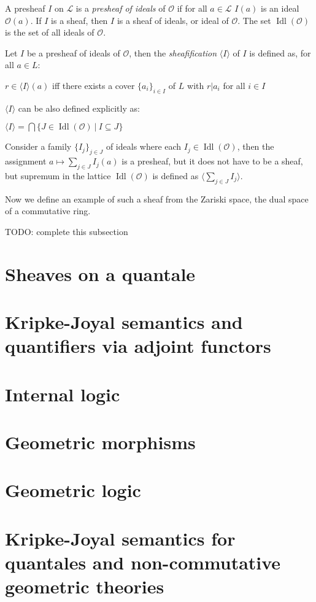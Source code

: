 \documentclass[a4paper]{article}
\theoremstyle{defin}
\theoremstyle{theorem}
\theoremstyle{claim}
\theoremstyle{prop}
\theoremstyle{lemma}
\theoremstyle{fact}
\theoremstyle{ex}
\theoremstyle{col}
\begin{document}
A presheaf $I$ on $\mathcal{L}$ is a \emph{presheaf of ideals} of $\mathcal{O}$ if for all $a \in \mathcal{L}$
$I(a)$ is an ideal $\mathcal{O}(a)$. If $I$ is a sheaf, then $I$ is a sheaf of ideals, or ideal of $\mathcal{O}$. The set $\operatorname{Idl}(\mathcal{O})$ is the set of all ideals of $\mathcal{O}$.

Let $I$ be a presheaf of ideals of $\mathcal{O}$, then the \emph{sheafification} $\langle I \rangle$ of $I$ is defined as, for all $a \in L$:
\begin{center}
$r \in \langle I \rangle(a)$ iff there exists a cover $\{ a_i \}_{i \in I}$ of $L$ with $r|a_i$ for all $i \in I$
\end{center}

$\langle I \rangle$ can be also defined explicitly as:
\begin{center}
$\langle I \rangle = \bigcap \{ J \in \operatorname{Idl}(\mathcal{O}) \: | \: I \subseteq J \}$
\end{center}

Consider a family $\{ I_j \}_{j \in J}$ of ideals where each $I_j \in \operatorname{Idl}(\mathcal{O})$, then the assignment $a \mapsto \sum \limits_{j \in J} I_j(a)$ is a presheaf, but it does not have to be a sheaf, but supremum in the lattice $\operatorname{Idl}(\mathcal{O})$ is defined as $\langle \sum \limits_{j \in J} I_j \rangle$.

Now we define an example of such a sheaf from the Zariski space, the dual space of a commutative ring.

TODO: complete this subsection

\section{Sheaves on a quantale}

\section{Kripke-Joyal semantics and quantifiers via adjoint functors}

\section{Internal logic}

\section{Geometric morphisms}

\section{Geometric logic}

\section{Kripke-Joyal semantics for quantales and non-commutative geometric theories}



\end{document}
